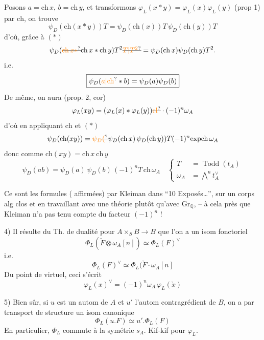 Posons $a=\mathrm{ch}\,x$, $b=\mathrm{ch}\,y$, et transformons $\varphi_L(x*y)=\varphi_L(x)\varphi_L(y)$ (prop 1) par $\mathrm{ch}$, on trouve
\[
\psi_D(\mathrm{ch}(x*y))T=\psi_D(\mathrm{ch}(x))T\,\psi_D(\mathrm{ch}(y))T
\]
 d'où,  grâce à $(*)$
\[
\psi_D(\deleted{\unsure{\mathrm{ch}\,x*}}\mathrm{ch}\,x*\mathrm{ch}\,y)T^{2}\deleted{\unsure{T|T^2}}=\psi_D(\mathrm{ch}\,x)\psi_D(\mathrm{ch}\,y)T^2.
\]
i.e.
\[
\boxed{\psi_D(\unsure{a|\mathrm{ch}}*b)=\psi_D(a)\psi_D(b)}
\]
De même, on aura (prop. 2, cor)
\[
\varphi_L(xy)=(\varphi_L(x)*\varphi_L(y))\deleted{\unsure{\mathrm{cl}}}\cdot(-1)^n\omega_A
\]
d'où en appliquant $\mathrm{ch}$ et $({*})$
\[
\psi_D(\mathrm{ch}(xy))=\deleted{\unsure{\psi_D(}}\psi_D(\mathrm{ch}\,x)\,\psi_D(\mathrm{ch}\,y))T(-1)^n\deleted{\exp}\mathrm{ch}\,\omega_A
\]
donc comme $\mathrm{ch}(xy)=\mathrm{ch}\,x\ \mathrm{ch}\,y$
\[
\boxed{\psi_D(ab)=\psi_D(a)\,\psi_D(b)\,(-1)^nT\,\mathrm{ch}\,\omega_A}
\quad\left\{\begin{aligned}
T&=\operatorname{Todd}(t_A)\\
\omega_A&=\bigwedge^n t_A^\vee
\end{aligned}\right.
\]

Ce sont les formules   ( affirmées) par Kleiman dans ``10 Exposés\ldots'', sur un corps alg clos et en travaillant avec une théorie  plutôt qu'avec $\mathrm{Gr}_{\mathbb Q}$, -- à cela près que Kleiman n'a pas tenu compte du facteur $(-1)^n$ !

4) Il résulte du Th. de dualité pour $A\times_S B\longrightarrow B$ que l'on a un isom fonctoriel
\[
\Phi_L(\check F\otimes\omega_A[n])\simeq\Phi_L(F)^\vee
\]
i.e.
\[
\boxed{\Phi_L(F)^\vee\simeq\Phi_L(\check F\mathbin{\cdot}\omega_A[n]}
\]
Du point de  virtuel, ceci s'écrit
\[
\varphi_L(x)^\vee=(-1)^n\omega_A\,\varphi_L(\check x)
\]

5) Bien sûr, si $u$ est un autom de $A$ et $u'$ l'autom contragrédient de $B$, on a par transport de structure un isom canonique
\[
\Phi_L(u.F)\simeq u'.\Phi_L(F)
\]
En particulier, $\Phi_L$ commute à la symétrie $s_A$. Kif-kif pour $\varphi_L$.
